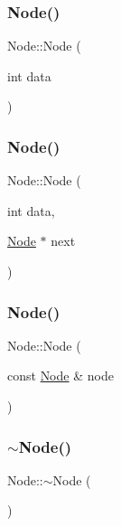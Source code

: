 \mbox{\label{class_node_aff71d952af8363f046a67a8b12194e46}} 
\subsubsection{\texorpdfstring{Node()}{Node()}\hspace{0.1cm}{\footnotesize\ttfamily [2/4]}}
{\footnotesize\ttfamily Node\+::\+Node (\begin{DoxyParamCaption}\item[{int}]{data }\end{DoxyParamCaption})}

\mbox{\label{class_node_aff31c12e14a6f00952a46ff967db0c96}} 
\subsubsection{\texorpdfstring{Node()}{Node()}\hspace{0.1cm}{\footnotesize\ttfamily [3/4]}}
{\footnotesize\ttfamily Node\+::\+Node (\begin{DoxyParamCaption}\item[{int}]{data,  }\item[{\hyperlink{class_node}{Node} $\ast$}]{next }\end{DoxyParamCaption})}

\mbox{\label{class_node_a4053c6deca192c41824fad14c4f4eb76}} 
\subsubsection{\texorpdfstring{Node()}{Node()}\hspace{0.1cm}{\footnotesize\ttfamily [4/4]}}
{\footnotesize\ttfamily Node\+::\+Node (\begin{DoxyParamCaption}\item[{const \hyperlink{class_node}{Node} \&}]{node }\end{DoxyParamCaption})}

\mbox{\label{class_node_aa0840c3cb5c7159be6d992adecd2097c}} 
\subsubsection{\texorpdfstring{$\sim$\+Node()}{~Node()}}
{\footnotesize\ttfamily Node\+::$\sim$\+Node (\begin{DoxyParamCaption}{ }\end{DoxyParamCaption})}



